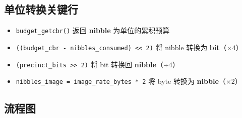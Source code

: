 \subsection{单位转换关键行}

\begin{itemize}
  \item \texttt{budget\_getcbr()} 返回 \textbf{nibble} 为单位的累积预算
  \item \texttt{((budget\_cbr - nibbles\_consumed) << 2)} 将 nibble 转换为 \textbf{bit}（$\times 4$）
  \item \texttt{(precinct\_bits >> 2)} 将 bit 转换回 \textbf{nibble}（$\div 4$）
  \item \texttt{nibbles\_image = image\_rate\_bytes * 2} 将 byte 转换为 \textbf{nibble}（$\times 2$）
\end{itemize}

\subsection{流程图}

